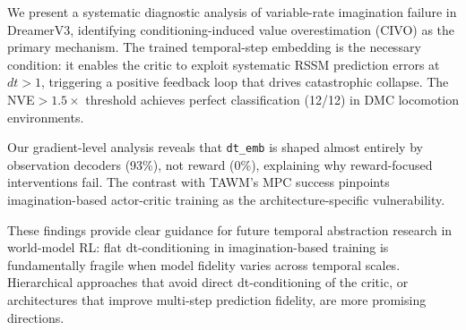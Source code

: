\documentclass[letterpaper]{article}
\begin{document}
We present a systematic diagnostic analysis of variable-rate imagination failure in DreamerV3, identifying conditioning-induced value overestimation (CIVO) as the primary mechanism.
The trained temporal-step embedding is the necessary condition: it enables the critic to exploit systematic RSSM prediction errors at $dt>1$, triggering a positive feedback loop that drives catastrophic collapse.
The NVE$>1.5\times$ threshold achieves perfect classification (12/12) in DMC locomotion environments.

Our gradient-level analysis reveals that \texttt{dt\_emb} is shaped almost entirely by observation decoders (93\%), not reward (0\%), explaining why reward-focused interventions fail.
The contrast with TAWM's MPC success pinpoints imagination-based actor-critic training as the architecture-specific vulnerability.

These findings provide clear guidance for future temporal abstraction research in world-model RL: flat dt-conditioning in imagination-based training is fundamentally fragile when model fidelity varies across temporal scales.
Hierarchical approaches that avoid direct dt-conditioning of the critic, or architectures that improve multi-step prediction fidelity, are more promising directions.
\end{document}
